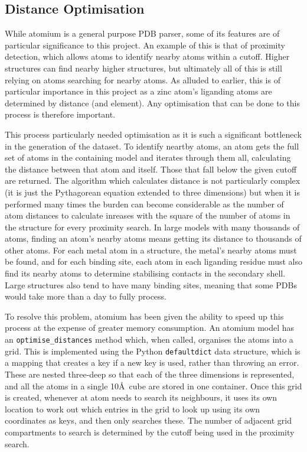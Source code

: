 \subsection{Distance Optimisation}

While atomium is a general purpose PDB parser, some of its features are of particular significance to this project. An example of this is that of proximity detection, which allows atoms to identify nearby atoms within a cutoff. Higher structures can find nearby higher structures, but ultimately all of this is still relying on atoms searching for nearby atoms. As alluded to earlier, this is of particular importance in this project as a zinc atom's liganding atoms are determined by distance (and element). Any optimisation that can be done to this process is therefore important.

This process particularly needed optimisation as it is such a significant bottleneck in the generation of the dataset. To identify neartby atoms, an atom gets the full set of atoms in the containing model and iterates through them all, calculating the distance between that atom and itself. Those that fall below the given cutoff are returned. The algorithm which calculates distance is not particularly complex (it is just the Pythagorean equation extended to three dimensions) but when it is performed many times the burden can become considerable as the number of atom distances to calculate inreases with the square of the number of atoms in the structure for every proximity search. In large models with many thousands of atoms, finding an atom's nearby atoms means getting its distance to thousands of other atoms. For each metal atom in a structure, the metal's nearby atoms must be found, and for each binding site, each atom in each liganding residue must also find its nearby atoms to determine stabilising contacts in the secondary shell. Large structures also tend to have many binding sites, meaning that some PDBs would take more than a day to fully process.

\setlength{\emergencystretch}{1em}
To resolve this problem, atomium has been given the ability to speed up this process at the expense of greater memory consumption. An atomium model has an \texttt{optimise\_distances} method which, when called, organises the atoms into a grid. This is implemented using the Python \texttt{defaultdict} data structure, which is a mapping that creates a key if a new key is used, rather than throwing an error. These are nested three-deep so that each of the three dimensions is represented, and all the atoms in a single 10\AA\ cube are stored in one container. Once this grid is created, whenever at atom needs to search its neighbours, it uses its own location to work out which entries in the grid to look up using its own coordinates as keys, and then only searches these. The number of adjacent grid compartments to search is determined by the cutoff being used in the proximity search.

